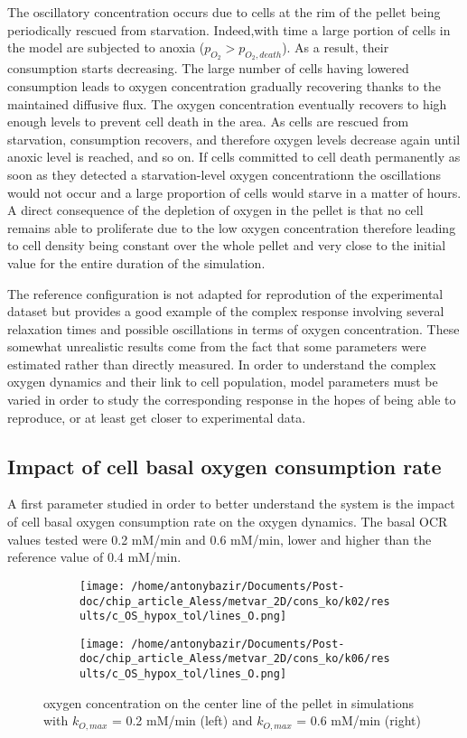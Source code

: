 \documentclass[11pt,a4paper]{article}
\begin{document}
The oscillatory concentration occurs due to cells at the rim of the pellet being periodically rescued from starvation. Indeed,with time a large portion of cells in the model are subjected to anoxia ($p_{O_2}>p_{O_2,death}$). As a result, their consumption starts decreasing. The large number of cells having lowered consumption leads to oxygen concentration gradually recovering thanks to the maintained diffusive flux. The oxygen concentration eventually recovers to high enough levels to prevent cell death in the area. As cells are rescued from starvation, consumption recovers, and therefore oxygen levels decrease again until anoxic level is reached, and so on. If cells committed to cell death permanently as soon as they detected a starvation-level oxygen concentrationn the oscillations would not occur and a large proportion of cells would starve in a matter of hours. A direct consequence of the depletion of oxygen in the pellet is that no cell remains able to proliferate due to the low oxygen concentration therefore leading to cell density being constant over the whole pellet and very close to the initial value for the entire duration of the simulation. 

The reference configuration is not adapted for reprodution of the experimental dataset but provides a good example of the complex response involving several relaxation times and possible oscillations in terms of oxygen concentration. These somewhat unrealistic results come from the fact that some parameters were estimated rather than directly measured. In order to understand the complex oxygen dynamics and their link to cell population, model parameters must be varied in order to study the corresponding response in the hopes of being able to reproduce, or at least get closer to experimental data.

\subsection{Impact of cell basal oxygen consumption rate} 
A first parameter studied in order to better understand the system is the impact of cell basal oxygen consumption rate on the oxygen dynamics. The basal OCR values tested were 0.2 mM/min and 0.6 mM/min, lower and higher than the reference value of 0.4 mM/min.

\begin{figure}[ht!]
\begin{subfigure}{0.44\textwidth}
	\centering
	\texttt{[image: /home/antonybazir/Documents/Post-doc/chip\_article\_Aless/metvar\_2D/cons\_ko/k02/results/c\_OS\_hypox\_tol/lines\_O.png]}
\end{subfigure}
\begin{subfigure}{0.44\textwidth}
	\centering
	\texttt{[image: /home/antonybazir/Documents/Post-doc/chip\_article\_Aless/metvar\_2D/cons\_ko/k06/results/c\_OS\_hypox\_tol/lines\_O.png]}
\end{subfigure}
\caption{oxygen concentration on the center line of the pellet in simulations with $k_{O,max}$ = 0.2 mM/min (left) and $k_{O,max}$ = 0.6 mM/min (right) \label{kcons_map}}
\end{figure}
\end{document}
